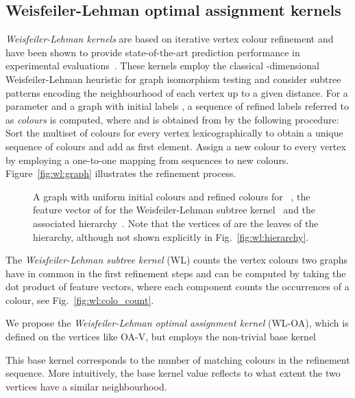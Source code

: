 \documentclass{article}
\begin{document}
\subsection{Weisfeiler-Lehman optimal assignment kernels} \label{sec:wl}

\emph{Weisfeiler-Lehman kernels} are based on iterative vertex colour refinement 
and have been shown to provide state-of-the-art prediction performance in 
experimental evaluations~\cite{Shervashidze2011}.
These kernels employ the classical -dimensional Weisfeiler-Lehman heuristic 
for graph isomorphism testing and consider subtree patterns encoding the
neighbourhood of each vertex up to a given distance. 
For a parameter  and a graph  with initial labels , a sequence 
 of refined labels referred to as \emph{colours} is computed,
where  and  is obtained from  by the following 
procedure:
Sort the multiset of colours  for every 
vertex  lexicographically to obtain a unique sequence of colours and add 
 as first element. Assign a new colour  to every vertex 
 by employing a one-to-one mapping from sequences to new colours. 
Figure~\ref{fig:wl:graph} illustrates the refinement process.
\begin{figure}
  \centering
  \null\hfill
  \hfill
  \hfill
  \hfill\null
  \caption{
    A graph  with uniform initial colours  and refined colours 
     for ~, 
    the feature vector of  for the Weisfeiler-Lehman subtree kernel~
    and the associated hierarchy~.
    Note that the vertices of  are the leaves of the hierarchy, although
    not shown explicitly in Fig.~\ref{fig:wl:hierarchy}.
  }
  \label{fig:wl}
\end{figure}
The \emph{Weisfeiler-Lehman subtree kernel} (WL) 
counts the vertex colours two graphs have in common in the first  refinement 
steps and can be computed by taking the dot product of feature vectors, where 
each component counts the occurrences of a colour, see Fig.~\ref{fig:wl:colo_count}.

We propose the \emph{Weisfeiler-Lehman optimal assignment kernel} (WL-OA),
which is defined on the vertices like OA-V, but employs the non-trivial base kernel 

This base kernel corresponds to the number of matching colours in the refinement 
sequence.
More intuitively, the base kernel value reflects to what extent the two vertices 
have a similar neighbourhood.
\end{document}
